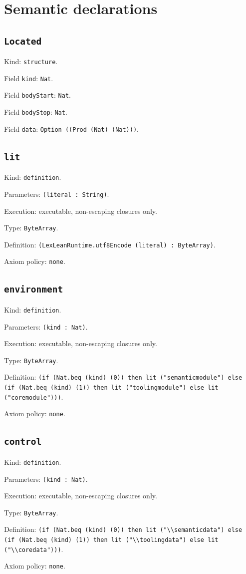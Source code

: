 \documentclass[11pt]{article}
\begin{document}
\section*{Semantic declarations}
\subsection*{\texttt{Located}}
\noindent Kind: \texttt{structure}.\par
\noindent Field \texttt{kind}: \texttt{Nat}.\par
\noindent Field \texttt{bodyStart}: \texttt{Nat}.\par
\noindent Field \texttt{bodyStop}: \texttt{Nat}.\par
\noindent Field \texttt{data}: \texttt{Option ((Prod (Nat) (Nat)))}.\par
\subsection*{\texttt{lit}}
\noindent Kind: \texttt{definition}.\par
\noindent Parameters: \texttt{(literal : String)}.\par
\noindent Execution: executable, non-escaping closures only.\par
\noindent Type: \texttt{ByteArray}.\par
\noindent Definition: \texttt{(LexLeanRuntime.utf8Encode (literal) : ByteArray)}.\par
\noindent Axiom policy: \texttt{none}.\par
\subsection*{\texttt{environment}}
\noindent Kind: \texttt{definition}.\par
\noindent Parameters: \texttt{(kind : Nat)}.\par
\noindent Execution: executable, non-escaping closures only.\par
\noindent Type: \texttt{ByteArray}.\par
\noindent Definition: \texttt{(if (Nat.beq (kind) (0)) then lit ("semanticmodule") else (if (Nat.beq (kind) (1)) then lit ("toolingmodule") else lit ("coremodule")))}.\par
\noindent Axiom policy: \texttt{none}.\par
\subsection*{\texttt{control}}
\noindent Kind: \texttt{definition}.\par
\noindent Parameters: \texttt{(kind : Nat)}.\par
\noindent Execution: executable, non-escaping closures only.\par
\noindent Type: \texttt{ByteArray}.\par
\noindent Definition: \texttt{(if (Nat.beq (kind) (0)) then lit ("\textbackslash{}\textbackslash{}semanticdata") else (if (Nat.beq (kind) (1)) then lit ("\textbackslash{}\textbackslash{}toolingdata") else lit ("\textbackslash{}\textbackslash{}coredata")))}.\par
\noindent Axiom policy: \texttt{none}.\par
\end{document}
